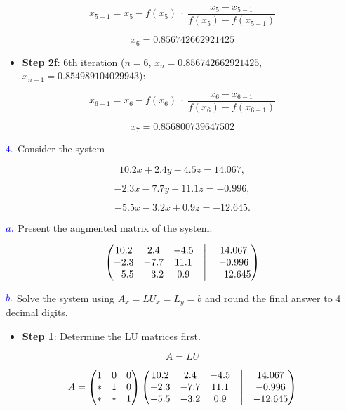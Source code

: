\documentclass[
]{article}
\providecommand{\tightlist}{%
  \setlength{\itemsep}{0pt}\setlength{\parskip}{0pt}}
\begin{document}
\[x_{5+1} = x_{5}-f(x_{5}) \ \cdot \ \frac{x_{5} - x_{5-1}}{f(x_{5})-f(x_{5-1})}\]

\[x_{6} = 0.856742662921425\]

\begin{itemize}
\tightlist
\item
  \textbf{Step 2f}: 6th iteration (\(n = 6\),
  \(x_{n} = 0.856742662921425\), \(x_{n-1} = 0.854989104029943\)):
\end{itemize}

\[x_{6+1} = x_{6}-f(x_{6}) \ \cdot \ \frac{x_{6} - x_{6-1}}{f(x_{6})-f(x_{6-1})}\]

\[x_{7} = 0.856800739647502\]

\(\textcolor{blue}{4.}\) Consider the system

\[10.2x + 2.4y - 4.5z = 14.067,\]

\[-2.3x - 7.7y + 11.1z = -0.996,\]

\[-5.5x - 3.2x + 0.9z = -12.645.\]

\(\textcolor{blue}{a.}\) Present the augmented matrix of the system.

\[
  \begin{pmatrix}
    10.2 & 2.4 & -4.5  &\bigm| & 14.067 \\
    -2.3 & -7.7 & 11.1  &\bigm| & -0.996 \\
    -5.5 & -3.2 & 0.9  &\bigm| & -12.645 
  \end{pmatrix}
  \]

\(\textcolor{blue}{b.}\) Solve the system using
\(A_{x} = LU_{x} = L_{y} = b\) and round the final answer to 4 decimal
digits.

\begin{itemize}
\tightlist
\item
  \textbf{Step 1}: Determine the LU matrices first.
\end{itemize}

\[A = LU\]

\[A = 
  \begin{pmatrix}
    1 & 0 & 0 \\
    * & 1 & 0 \\
    * & * & 1 
   \end{pmatrix}
   \begin{pmatrix}
    10.2 & 2.4 & -4.5  &\bigm| & 14.067 \\
    -2.3 & -7.7 & 11.1  &\bigm| & -0.996 \\
    -5.5 & -3.2 & 0.9  &\bigm| & -12.645 
   \end{pmatrix}
   \]
\end{document}
